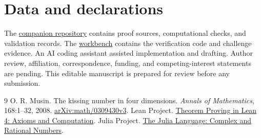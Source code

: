 \documentclass[11pt]{article}
\begin{document}
\section*{Data and declarations}
The \href{https://github.com/creelie/Anaxia-Research}{companion repository} contains proof sources, computational checks, and validation records. The \href{https://github.com/creelie/Anaxia}{workbench} contains the verification code and challenge evidence. An AI coding assistant assisted implementation and drafting. Author review, affiliation, correspondence, funding, and competing-interest statements are pending. This editable manuscript is prepared for review before any submission.

\begin{thebibliography}{9}
 O. R. Musin. The kissing number in four dimensions. \textit{Annals of Mathematics}, 168:1--32, 2008. \href{https://arxiv.org/abs/math/0309430v3}{arXiv:math/0309430v3}.
 Lean Project. \href{https://lean-lang.org/theorem_proving_in_lean4/Axioms-and-Computation/}{Theorem Proving in Lean 4: Axioms and Computation}.
 Julia Project. \href{https://docs.julialang.org/en/v1/manual/complex-and-rational-numbers/}{The Julia Language: Complex and Rational Numbers}.
\end{thebibliography}
\end{document}
